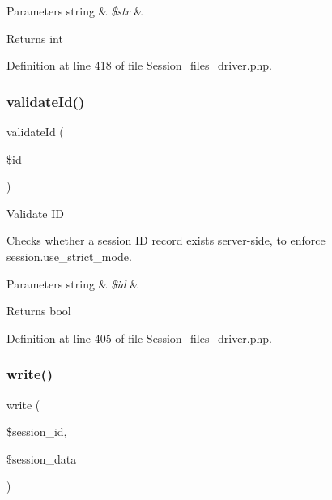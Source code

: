 \begin{DoxyParams}[1]{Parameters}
string & {\em \$str} & \\
\hline
\end{DoxyParams}
\begin{DoxyReturn}{Returns}
int 
\end{DoxyReturn}


Definition at line 418 of file Session\+\_\+files\+\_\+driver.\+php.

\mbox{\label{class_c_i___session__files__driver_a4a58e8f59b2accc199bbebd5ee52bc74}} 
\subsubsection{\texorpdfstring{validateId()}{validateId()}}
{\footnotesize\ttfamily validate\+Id (\begin{DoxyParamCaption}\item[{}]{\$id }\end{DoxyParamCaption})}

Validate ID

Checks whether a session ID record exists server-\/side, to enforce session.\+use\+\_\+strict\+\_\+mode.


\begin{DoxyParams}[1]{Parameters}
string & {\em \$id} & \\
\hline
\end{DoxyParams}
\begin{DoxyReturn}{Returns}
bool 
\end{DoxyReturn}


Definition at line 405 of file Session\+\_\+files\+\_\+driver.\+php.

\mbox{\label{class_c_i___session__files__driver_ad9d124885be93668f1dbf6aace5964f5}} 
\subsubsection{\texorpdfstring{write()}{write()}}
{\footnotesize\ttfamily write (\begin{DoxyParamCaption}\item[{}]{\$session\+\_\+id,  }\item[{}]{\$session\+\_\+data }\end{DoxyParamCaption})}

